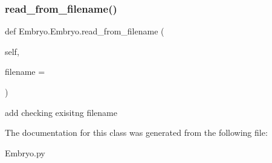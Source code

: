 \subsubsection{\texorpdfstring{read\_from\_filename()}{read\_from\_filename()}}
{\footnotesize\ttfamily def Embryo.\+Embryo.\+read\+\_\+from\+\_\+filename (\begin{DoxyParamCaption}\item[{}]{self,  }\item[{}]{filename = {\ttfamily \textquotesingle{}\textquotesingle{}} }\end{DoxyParamCaption})}

\begin{DoxyVerb}add checking exisitng filename \end{DoxyVerb}
 

The documentation for this class was generated from the following file\+:\begin{DoxyCompactItemize}
\item 
Embryo.\+py\end{DoxyCompactItemize}
